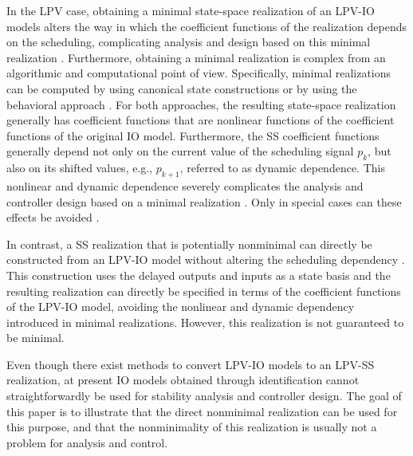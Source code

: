 In the LPV case, obtaining a minimal state-space realization of an LPV-IO models alters the way in which the coefficient functions of the realization depends on the scheduling, complicating analysis and design based on this minimal realization \cite{Wollnack2015}. Furthermore, obtaining a minimal realization is complex from an algorithmic and computational point of view. Specifically, minimal realizations can be computed by using canonical state constructions \cite{Guidorzi2003, Weiss2005, Toth2007} or by using the behavioral approach \cite{Toth2010}. For both approaches, the resulting state-space realization generally has coefficient functions that are nonlinear functions of the coefficient functions of the original IO model. Furthermore, the SS coefficient functions generally depend not only on the current value of the scheduling signal $p_k$, but also on its shifted values, e.g., $p_{k+1}$, referred to as dynamic dependence. This nonlinear and dynamic dependence severely complicates the analysis and controller design based on a minimal realization \cite{Wollnack2015}. Only in special cases can these effects be avoided \cite{Toth2012b}. 

In contrast, a SS realization that is potentially nonminimal can directly be constructed from an LPV-IO model without altering the scheduling dependency \cite{Toth2013, Goodwin1984,Pearson2004, DePersis2020}. 
This construction uses the delayed outputs and inputs as a state basis and the resulting realization can directly be specified in terms of the coefficient functions of the LPV-IO model, avoiding the nonlinear and dynamic dependency introduced in minimal realizations.
However, this realization is not guaranteed to be minimal. 

Even though there exist methods to convert LPV-IO models to an LPV-SS realization, at present IO models obtained through identification cannot straightforwardly be used for stability analysis and controller design. The goal of this paper is to illustrate that the direct nonminimal realization can be used for this purpose, and that the nonminimality of this realization is usually not a problem for analysis and control.


